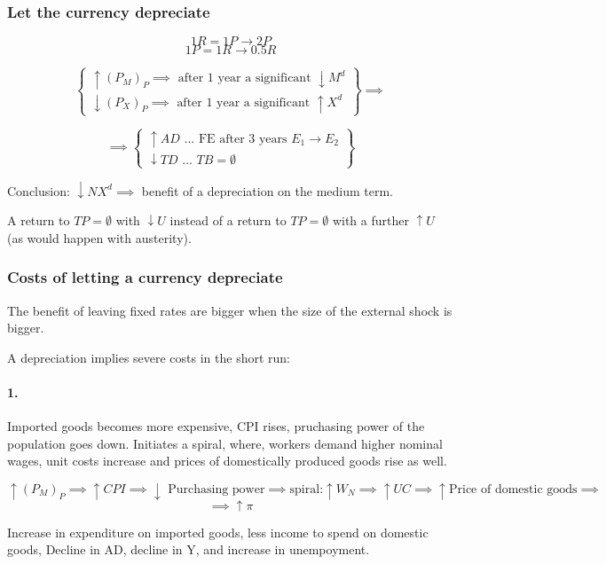\documentclass{report}
\begin{document}
\subsubsection{Let the currency depreciate}
$$1R=1P \rightarrow 2P$$
$$1P=1R \rightarrow 0.5R$$

$$\left\{ \begin{array}{l}
     \uparrow (P_M)_P \implies \text{ after 1 year a significant } \downarrow M^d \\
\downarrow (P_X)_P \implies \text{ after 1 year a significant } \uparrow X^d
\end{array} \right\} \implies$$


$$ \implies \left\{\begin{array}{l}
     \uparrow AD\text{ ... FE after 3 years } E_1\rightarrow E_2  \\
     \downarrow TD \text{ ... } TB=\emptyset 
\end{array} \right\} $$

Conclusion: $\downarrow NX^d \implies$ benefit of a depreciation on the medium term. 

A return to $TP=\emptyset$ with $\downarrow U$ instead of a return to $TP=\emptyset$ with a further $\uparrow U$ (as would happen with austerity).

\subsubsection{Costs of letting a currency depreciate}

The benefit of leaving fixed rates are bigger when the size of the external shock is bigger. 

A depreciation implies severe costs in the short run:
\paragraph{1.}
Imported goods becomes more expensive, CPI rises, pruchasing power of the population goes down. Initiates a spiral, where, workers demand higher nominal wages, unit costs increase and prices of domestically produced goods rise as well. 

$$\uparrow (P_M)_P \implies \uparrow CPI \implies \downarrow \text{ Purchasing power} \implies \text{spiral:} \uparrow W_N \implies \uparrow UC \implies \uparrow \text{Price of domestic goods} \implies$$
$$\implies \uparrow \pi$$

Increase in expenditure on imported goods, less income to spend on domestic goods, Decline in AD, decline in Y, and increase in unempoyment. 
\end{document}
